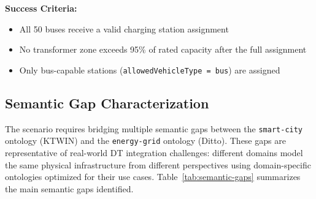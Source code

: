 \textbf{Success Criteria:}
\begin{itemize}
    \item All 50 buses receive a valid charging station assignment
    \item No transformer zone exceeds 95\% of rated capacity after the full assignment
    \item Only bus-capable stations (\texttt{allowedVehicleType = bus}) are assigned
\end{itemize}

\subsection{Semantic Gap Characterization}
\label{subsec:semantic-gaps}

The scenario requires bridging multiple semantic gaps between the
    \texttt{smart-city} ontology (KTWIN) and the
    \texttt{energy-grid} ontology (Ditto).
These gaps are representative of real-world DT integration challenges:
    different domains model the same physical infrastructure from different perspectives using
    domain-specific ontologies optimized for their use cases.
Table~\ref{tab:semantic-gaps} summarizes the main semantic gaps identified.

